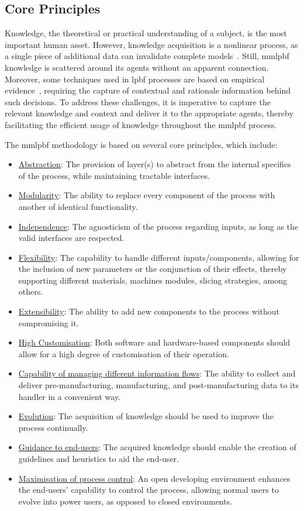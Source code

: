 \subsection{Core Principles}
Knowledge, the theoretical or practical understanding of a subject, is the most
important human asset. However, knowledge acquisition is a nonlinear process, as
a single piece of additional data can invalidate complete
models~\cite{bruegge2004object}.
Still, \gls{mmlpbf} knowledge is scattered around its agents without an apparent
connection.
Moreover, some techniques used in \gls{lpbf} processes are based on empirical evidence~\cite{thompson2015overview}, requiring the capture of contextual and rationale information behind such decisions. To address these challenges, it is imperative to capture the relevant knowledge and context and deliver it to the appropriate agents, thereby facilitating the efficient usage of knowledge throughout the \gls{mmlpbf} process.


The \gls{mmlpbf} methodology is based on several core principles, which include:
\begin{itemize}
\item \underline{Abstraction}: The provision of layer(s) to abstract from the internal specifics of the process, while maintaining tractable interfaces.
\item \underline{Modularity}: The ability to replace every component of the process with another of identical functionality.
\item \underline{Independence}: The agnosticism of the process regarding inputs, as long as the valid interfaces are respected.
\item \underline{Flexibility}: The capability to handle different inputs/components, allowing for the inclusion of new parameters or the conjunction of their effects, thereby supporting different materials, machines modules, slicing strategies, among others.
\item \underline{Extensibility}: The ability to add new components to the process without compromising it.
\item \underline{High Customisation}: Both software and hardware-based components should allow for a high degree of customisation of their operation.
\item \underline{Capability of managing different information flows}: The ability to collect and deliver pre-manufacturing, manufacturing, and post-manufacturing data to its handler in a convenient way.
\item \underline{Evolution}: The acquisition of knowledge should be used to improve the process continually.
\item \underline{Guidance to end-users}: The acquired knowledge should enable the creation of guidelines and heuristics to aid the end-user.
\item \underline{Maximisation of process control}: An open developing environment enhances the end-users' capability to control the process, allowing normal users to evolve into power users, as opposed to closed environments.
\end{itemize}

